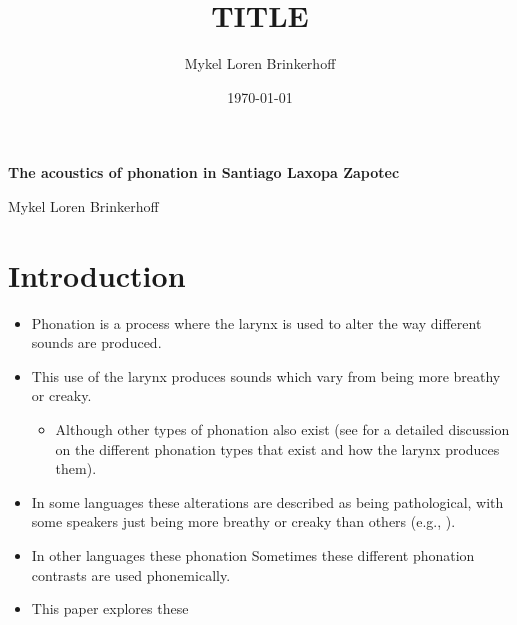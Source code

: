 \documentclass[12pt, letterpaper]{article}
\title{TITLE}
\author{Mykel Loren Brinkerhoff}
\date{\today}
\begin{document}


\begin{center}
    {\Large \textbf{The acoustics of phonation in Santiago Laxopa Zapotec}}
    \vspace{6pt}

    Mykel Loren Brinkerhoff
\end{center}
\thispagestyle{fancy}

\tableofcontents

\section{Introduction} \label{sec:Introduction}

\begin{itemize}
    \item Phonation is a process where the larynx is used to alter the way different sounds are produced. 
	\item This use of the larynx produces sounds which vary from being more breathy or creaky.
	\begin{itemize}
		\item Although other types of phonation also exist (see \cite{eslingVoiceQualityLaryngeal2019} for a detailed discussion on the different phonation types that exist and how the larynx produces them).
	\end{itemize} 
	\item In some languages these alterations are described as being pathological, with some speakers just being more breathy or creaky than others (e.g., \cite{klattAnalysisSynthesisPerception1990}). 
    \item In other languages these phonation Sometimes these different phonation contrasts are used phonemically.
    \item This paper explores these 
\end{itemize}
\end{document}
